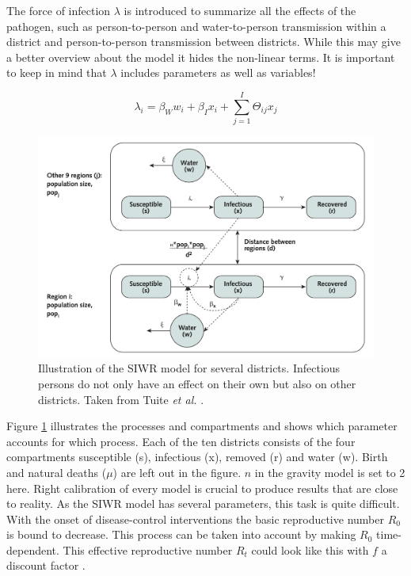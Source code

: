 \documentclass[11pt]{article}
\begin{document}
The force of infection $ \lambda $ is introduced to summarize all the effects of the pathogen, such as person-to-person and water-to-person transmission within a district and person-to-person transmission between districts. While this may give a better overview about the model it hides the non-linear terms. It is important to keep in mind that $ \lambda $ includes parameters as well as variables! 


\begin{equation}

\lambda_{i}=\beta_{W}w_{i}+\beta_{I}x_{i}+\sum\limits_{j=1}^I  \Theta_{ij}  x_{j}

\end{equation}


\begin{figure}

\includegraphics[scale=.7]{Bilder/figure_model_haiti.png}
\caption{Illustration of the SIWR model for several districts. Infectious persons do not only have an effect on their own but also on other districts. Taken from Tuite \textit{et al.} \cite{tuite:2011}.}
\label{pic:model_departments}
\end{figure}



Figure \ref{pic:model_departments} illustrates the processes and compartments and shows which parameter accounts for which process. Each of the ten districts consists of the four compartments susceptible (s), infectious (x), removed (r) and water (w). Birth and natural deaths ($ \mu $) are left out in the figure. $ n $ in the gravity model is set to 2 here. Right calibration of every model is crucial to produce results that are close to reality. As the SIWR model has several parameters, this task is quite difficult. With the onset of disease-control interventions the basic reproductive number $ R_{0} $ is bound to decrease. This process can be taken into account by making $ R_{0} $ time-dependent. This effective reproductive number $ R_{t} $ could look like this with $ f $ a discount factor \cite{tuite:2011}.
\end{document}
